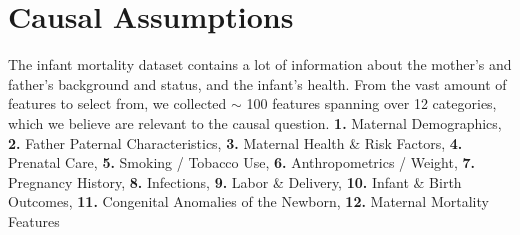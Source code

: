 \documentclass[a4paper,12pt]{article} %
\begin{document}
\section{Causal Assumptions} %
The infant mortality dataset contains a lot of information about the mother's and father's background and status, and the infant's health. \newline
From the vast amount of features to select from, we collected $\sim$ 100 features spanning over 12 categories, which we believe are relevant to the causal question. \newline
\textbf{1.} Maternal Demographics, \textbf{2.} Father Paternal Characteristics, \textbf{3.} Maternal Health \& Risk Factors, \textbf{4.} Prenatal Care, \textbf{5.} Smoking / Tobacco Use, \textbf{6.} Anthropometrics / Weight, \textbf{7.} Pregnancy History, \textbf{8.} Infections, \textbf{9.} Labor \& Delivery, \textbf{10.} Infant \& Birth Outcomes, \textbf{11.} Congenital Anomalies of the Newborn, \textbf{12.} Maternal Mortality Features
\end{document}
